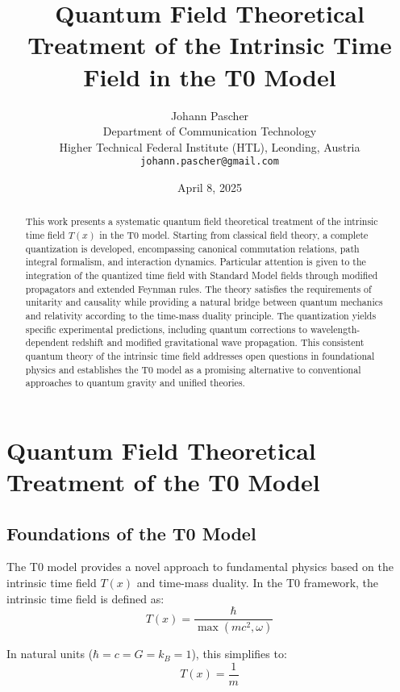 \documentclass[12pt,a4paper]{article}
\title{Quantum Field Theoretical Treatment of the Intrinsic Time Field in the T0 Model}
\author{Johann Pascher\\
	Department of Communication Technology\\
	Higher Technical Federal Institute (HTL), Leonding, Austria\\
	\texttt{johann.pascher@gmail.com}}
\date{April 8, 2025}
\newcommand{\Tfield}{T(x)}
\begin{document}
	
	\maketitle
	
	\begin{abstract}
		This work presents a systematic quantum field theoretical treatment of the intrinsic time field $\Tfield$ in the T0 model. Starting from classical field theory, a complete quantization is developed, encompassing canonical commutation relations, path integral formalism, and interaction dynamics. Particular attention is given to the integration of the quantized time field with Standard Model fields through modified propagators and extended Feynman rules. The theory satisfies the requirements of unitarity and causality while providing a natural bridge between quantum mechanics and relativity according to the time-mass duality principle. The quantization yields specific experimental predictions, including quantum corrections to wavelength-dependent redshift and modified gravitational wave propagation. This consistent quantum theory of the intrinsic time field addresses open questions in foundational physics and establishes the T0 model as a promising alternative to conventional approaches to quantum gravity and unified theories.
	\end{abstract}
	
	\tableofcontents
	\newpage
	
	\section{Quantum Field Theoretical Treatment of the T0 Model}
	\label{sec:qft_treatment}
	
	\subsection{Foundations of the T0 Model}
	\label{subsec:foundations}
	
	The T0 model provides a novel approach to fundamental physics based on the intrinsic time field $T(x)$ and time-mass duality. In the T0 framework, the intrinsic time field is defined as:
	\begin{equation}
		T(x) = \frac{\hbar}{\max(mc^2, \omega)}
		\label{eq:intrinsic_time}
	\end{equation}
	
	In natural units ($\hbar = c = G = k_B = 1$), this simplifies to:
	\begin{equation}
		T(x) = \frac{1}{m}
		\label{eq:natural_units_time}
	\end{equation}
	
\end{document}
